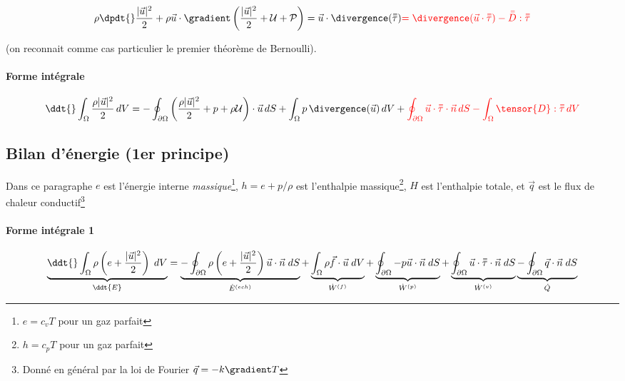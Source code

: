 \begin{equation}
		\rho \dpdt{} \frac{ |\vec{u}|^2}{2} 
		+ \rho \vec{u} \cdot \gradient \left( \frac{ |\vec{u}|^2}{2} + {\cal U} +  {\cal P} \right) 
		= 
		 \vec{u} \cdot \divergence ( \mytensor{\tau} ) \textcolor{red}{= \divergence ( \vec{u} \cdot \mytensor{\tau} ) - \mytensor{D} :\mytensor{\tau}}
\end{equation}

(on reconnait comme cas particulier le premier théorème de Bernoulli).



\paragraph{Forme intégrale}
	\begin{equation}
		\ddt{} \int_{\Omega} \frac{\rho |\vec{u}|^2}{2} \, dV 
		= -  \oint_{\partial \Omega} \left( \frac{\rho |\vec{u}|^2}{2} + p + \rho {\cal U} \right)  \cdot \vec u \, dS
		+ \int_{\Omega} p \, \divergence (\vec{u}) \, dV 
+ \textcolor{red}{ \oint_{\partial \Omega}  \vec{u} \cdot \mytensor{\tau} \cdot \vec{n} \, dS
 -  \int_{\Omega} \tensor{D} : \mytensor{\tau}  \, dV}	
		\label{eq:bilan_global_eulerien_ec}
	\end{equation}


\subsection{Bilan d'énergie (1er principe)}

Dans ce paragraphe $e$ est l'énergie interne {\em massique}\footnote{ $e = c_v T$ pour un gaz parfait}, $h = e+p/\rho$ est l'enthalpie massique\footnote{ $h = c_p T$ pour un gaz parfait}, $H$ est l'enthalpie totale, et $\vec q$ est le flux de chaleur conductif\footnote{ Donné en général par la loi de Fourier $\vec{q}=-k \gradient T$ }  

\paragraph{Forme intégrale 1}
\begin{equation}
		\underbrace{\ddt{} \int_{\Omega} \rho \left( e + \frac{ |\vec{u}|^2}{2} \right) \; dV
		}_{\ddt{E} }		 
		= \underbrace{  - \oint_{\partial \Omega}  \rho \left( e + \frac{ |\vec{u}|^2}{2} \right) \vec{u} \cdot \vec{n} \; dS
		}_{\dot{E}^{(ech)}}
		+ \underbrace{\int_{\Omega} \rho \vec{f} \cdot \vec{u} \; dV
		}_{\dot{W}^{(f)}} 
		+ \underbrace{ \oint_{\partial \Omega} -p \vec{u} \cdot  \vec{n}   \; dS 
		}_{\dot{W}^{(p)}} 
		+ \underbrace{ \oint_{\partial \Omega} \vec{u} \cdot  \mytensor{\tau} \cdot \vec{n}  \; dS 
		}_{\dot{W}^{(v)}} 
		 \underbrace{ - \oint_{\partial \Omega} \vec{q} \cdot \vec{n} \; dS
		}_{\dot{Q}} 
		\label{eq:bilan_global_eulerien_e1}
\end{equation}

